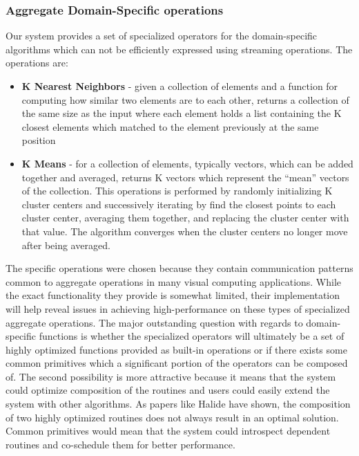 \documentclass[tog]{acmsiggraph}
\begin{document}
\subsubsection{Aggregate Domain-Specific operations}
Our system provides a set of specialized operators for the domain-specific
algorithms which can not be efficiently expressed using streaming
operations. The operations are:

\begin{itemize}
\item \textbf{K Nearest Neighbors} - given a collection of elements and a
  function for computing how similar two elements are to each other, returns a
  collection of the same size as the input where each element holds a list
  containing the K closest elements which matched to the element previously at
  the same position
\item \textbf{K Means} - for a collection of elements, typically vectors, which
  can be added together and averaged, returns K vectors which represent the
  ``mean'' vectors of the collection. This operations is performed by randomly
  initializing K cluster centers and successively iterating by find the closest
  points to each cluster center, averaging them together, and replacing the
  cluster center with that value. The algorithm converges when the cluster
  centers no longer move after being averaged.
\end{itemize}

The specific operations were chosen because they contain communication patterns
common to aggregate operations in many visual computing applications. While the
exact functionality they provide is somewhat limited, their implementation will
help reveal issues in achieving high-performance on these types of specialized
aggregate operations. The major outstanding question with regards to
domain-specific functions is whether the specialized operators will ultimately
be a set of highly optimized functions provided as built-in operations or if
there exists some common primitives which a significant portion of the
operators can be composed of. The second possibility is more attractive because
it means that the system could optimize composition of the routines and users
could easily extend the system with other algorithms. As papers like Halide
have shown, the composition of two highly optimized routines does not always
result in an optimal solution. Common primitives would mean that the system
could introspect dependent routines and co-schedule them for better
performance.
\end{document}
